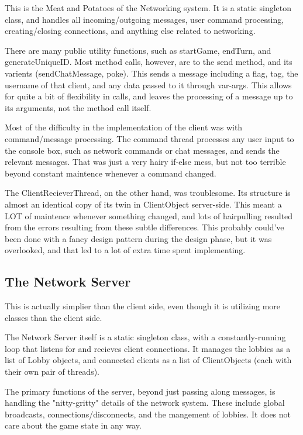 \documentclass[12pt,a4paper]{article}
\begin{document}
This is the Meat and Potatoes of the Networking system. It is a static singleton class, and handles all incoming/outgoing messages, user command processing, creating/closing connections, and anything else related to networking.

There are many public utility functions, such as startGame, endTurn, and generateUniqueID.
Most method calls, however, are to the send method, and its varients (sendChatMessage, poke). This sends a message including a flag, tag, the username of that client, and any data passed to it through var-args. This allows for quite a bit of flexibility in calls, and leaves the processing of a message up to its arguments, not the method call itself.

Most of the difficulty in the implementation of the client was with command/message processing. The command thread processes any user input to the console box, such as network commands or chat messages, and sends the relevant messages. That was just a very hairy if-else mess, but not too terrible beyond constant maintence whenever a command changed.

The ClientRecieverThread, on the other hand, was troublesome. Its structure is almost an identical copy of its twin in ClientObject server-side. This meant a LOT of maintence whenever something changed, and lots of hairpulling resulted from the errors  resulting from these subtle differences. This probably could've been done with a fancy design pattern during the design phase, but it was overlooked, and that led to a lot of extra time spent implementing.

\subsection{The Network Server}

This is actually simplier than the client side, even though it is utilizing more classes than the client side. 

The Network Server itself is a static singleton class, with a constantly-running loop that listens for and recieves client connections. It manages the lobbies as a list of Lobby objects, and connected clients as a list of ClientObjects (each with their own pair of threads). 

The primary functions of the server, beyond just passing along messages, is handling the "nitty-gritty" details of the network system. 
These include global broadcasts, connections/disconnects, and the mangement of lobbies. It does not care about the game state in any way.
\end{document}
